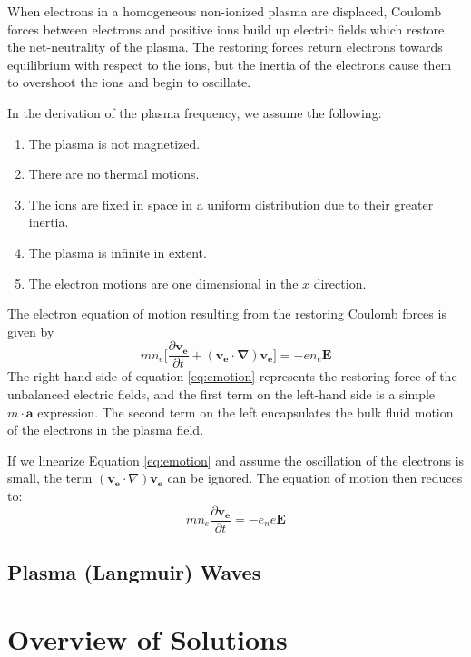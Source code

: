 \documentclass[twocolumn]{article}
\begin{document}
When electrons in a homogeneous non-ionized plasma are displaced, Coulomb forces between electrons and positive ions build up electric fields which restore the net-neutrality of the plasma.
The restoring forces return electrons towards equilibrium with respect to the ions, but the inertia of the electrons cause them to overshoot the ions and begin to oscillate.

In the derivation of the plasma frequency, we assume the following:
\begin{enumerate}
	\item The plasma is not magnetized.
	\item There are no thermal motions.
	\item The ions are fixed in space in a uniform distribution due to their greater inertia.
	\item The plasma is infinite in extent.
	\item The electron motions are one dimensional in the $x$ direction.
\end{enumerate}

The electron equation of motion resulting from the restoring Coulomb forces is given by
\begin{equation} \label{eq:emotion}
	mn_e \lbrack \frac{\partial \mathbf{v_e}}{\partial t} + \left( \mathbf{v_e} \cdot \mathbf{\nabla} \right) \mathbf{v_e} \rbrack = -en_e\mathbf{E}
\end{equation}
The right-hand side of equation \ref{eq:emotion} represents the restoring force of the unbalanced electric fields, and the first term on the left-hand side is a simple $m\cdot\mathbf{a}$ expression.
The second term on the left encapsulates the bulk fluid motion of the electrons in the plasma field.

If we linearize Equation \ref{eq:emotion} and assume the oscillation of the electrons is small, the term $\left(\mathbf{v_e} \cdot \nabla \right) \mathbf{v_e}$ can be ignored.
The equation of motion then reduces to:
\begin{equation}
	mn_e \frac{\partial \mathbf{v_e}}{\partial t} = -e_ne \mathbf{E}
\end{equation}

\subsection*{Plasma (Langmuir) Waves}



\section{Overview of Solutions} \label{sec:Overview}
\end{document}
